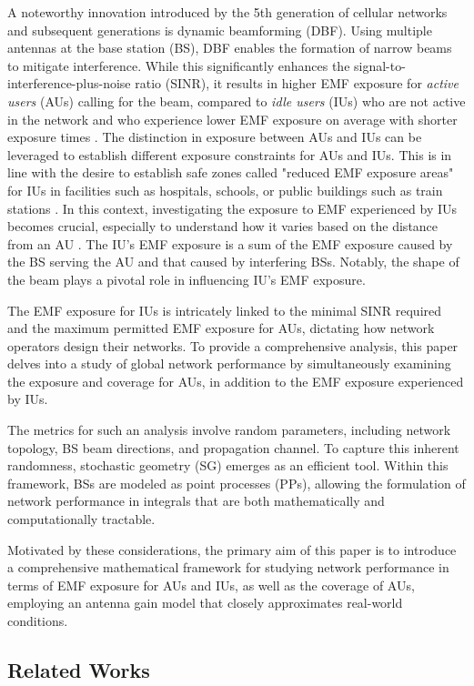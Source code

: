 A noteworthy innovation introduced by the 5th generation of cellular networks and subsequent generations is dynamic beamforming (DBF). Using multiple antennas at the base station (BS), DBF enables the formation of narrow beams to mitigate interference. While this significantly enhances the signal-to-interference-plus-noise ratio (SINR), it results in higher EMF exposure for \textit{active users} (AUs) calling for the beam, compared to \textit{idle users} (IUs) who are not active in the network and who experience lower EMF exposure on average with shorter exposure times \cite{ANFR2019a}. The distinction in exposure between AUs and IUs can be leveraged to establish different exposure constraints for AUs and IUs. This is in line with the desire to establish safe zones called "reduced EMF exposure areas" for IUs in facilities such as hospitals, schools, or public buildings such as train stations \cite{strinati2021wireless}. In this context, investigating the exposure to EMF experienced by IUs becomes crucial, especially to understand how it varies based on the distance from an AU \cite{IMEC_nl}. The IU's EMF exposure is a sum of the EMF exposure caused by the BS serving the AU and that caused by interfering BSs. Notably, the shape of the beam plays a pivotal role in influencing IU's EMF exposure.

The EMF exposure for IUs is intricately linked to the minimal SINR required and the maximum permitted EMF exposure for AUs, dictating how network operators design their networks. To provide a comprehensive analysis, this paper delves into a study of global network performance by simultaneously examining the exposure and coverage for AUs, in addition to the EMF exposure experienced by IUs.

The metrics for such an analysis involve random parameters, including network topology, BS beam directions, and propagation channel. To capture this inherent randomness, stochastic geometry (SG) emerges as an efficient tool. Within this framework, BSs are modeled as point processes (PPs), allowing the formulation of network performance in integrals that are both mathematically and computationally tractable.

Motivated by these considerations, the primary aim of this paper is to introduce a comprehensive mathematical framework for studying network performance in terms of EMF exposure for AUs and IUs, as well as the coverage of AUs, employing an antenna gain model that closely approximates real-world conditions.

\subsection{Related Works}
\label{ssec:related_works}

